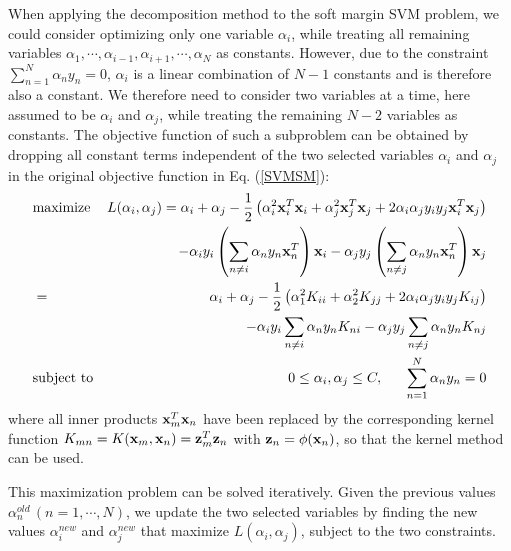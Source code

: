 \documentclass{article}
\begin{document}
When applying the decomposition method to the soft margin SVM problem, we
could consider optimizing only one variable $\alpha_i$, while treating all
remaining variables $\alpha_1,\cdots,\alpha_{i-1},\alpha_{i+1},\cdots,\alpha_N$
as constants. However, due to the constraint $\sum_{n=1}^N\alpha_ny_n=0$, 
$\alpha_i$ is a linear combination of $N-1$ constants and is therefore 
also a constant. We therefore need to consider two variables at a time, 
here assumed to be $\alpha_i$ and $\alpha_j$, while treating the remaining
$N-2$ variables as constants. The objective function of such a subproblem 
can be obtained by dropping all constant terms independent of the two 
selected variables $\alpha_i$ and $\alpha_j$ in the original objective
function in Eq. (\ref{SVMSM}):
\begin{eqnarray}
  & \mbox{maximize} & L(\alpha_i,\alpha_j)
  =\alpha_i+\alpha_j-\frac{1}{2}\left(
    \alpha_i^2{\bf x}_i^T{\bf x}_i+\alpha_j^2{\bf x}_j^T{\bf x}_j
  +2\alpha_i\alpha_jy_iy_j{\bf x}_i^T{\bf x}_j\right)
  \nonumber\\
  &&-\alpha_iy_i\left(\sum_{n\ne i}\alpha_ny_n{\bf x}_n^T\right){\bf x}_i
    -\alpha_jy_j\left(\sum_{n\ne j}\alpha_ny_n{\bf x}_n^T\right){\bf x}_j
  \nonumber\\
  &=&\alpha_i+\alpha_j-\frac{1}{2}\left(\alpha_1^2 K_{ii}+\alpha_2^2K_{jj}
  +2\alpha_i\alpha_jy_iy_jK_{ij}\right)
  \nonumber\\
  &&-\alpha_iy_i\sum_{n\ne i}\alpha_ny_nK_{ni}
    -\alpha_jy_j\sum_{n\ne j}\alpha_ny_nK_{nj}
  \nonumber\\
  & \mbox{subject to} & 0\le\alpha_i,\alpha_j\le C,\;\;\;\;\;\;
  \sum_{n=1}^N \alpha_ny_n=0
  \label{objective2}
\end{eqnarray}
where all inner products ${\bf x}_m^T{\bf x}_n$ have been replaced 
by the corresponding kernel function 
$K_{mn}=K({\bf x}_m,{\bf x}_n)={\bf z}_m^T{\bf z}_n$ with
${\bf z}_n=\phi({\bf x}_n)$, so that the kernel method can be used.

This maximization problem can be solved iteratively. Given the 
previous values $\alpha_n^{old}\,(n=1,\cdots,N)$, we update the two
selected variables by finding the new values $\alpha_i^{new}$ and
$\alpha_j^{new}$ that maximize $L(\alpha_i,\alpha_j)$, subject to 
the two constraints. 
\end{document}
